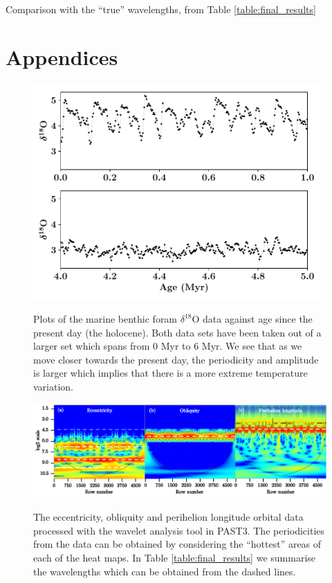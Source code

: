\documentclass[12pt, onecolumn]{revtex4}    %
\begin{document}
Comparison with the ``true'' wavelengths, from Table \ref{table:final_results} 

\newpage





\newpage

\section*{Appendices}
\begin{figure}[!h]
\begin{center}
\includegraphics[width=11cm]{figures/foram_data}
\caption[]{Plots of the marine benthic foram $\delta^{18}$O data against age since the present day (the holocene). Both data sets have been taken out of a larger set which spans from 0 Myr to 6 Myr. We see that as we move closer towards the present day, the periodicity and amplitude is larger which implies that there is a more extreme temperature variation.}
\vspace{-3ex}
\label{fig:foram_data}
\end{center}
\end{figure}

\begin{figure}[!h]
\begin{center}
\includegraphics[width=16cm]{figures/wa_orbital_data}
\caption[]{The eccentricity, obliquity and perihelion longitude orbital data processed with the wavelet analysis tool in PAST3. The periodicities from the data can be obtained by considering the ``hottest'' areas of each of the heat maps. In Table \ref{table:final_results} we summarise the wavelengths which can be obtained from the dashed lines.}
\vspace{-3ex}
\label{fig:wa_orbital_data}
\end{center}
\end{figure}
\end{document}

